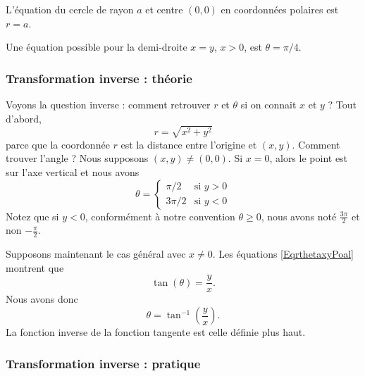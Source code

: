 \begin{example}
L'équation du cercle de rayon $a$ et centre $(0, 0)$ en coordonnées polaires est $r=a$.
\end{example}

\begin{example}
	Une équation possible pour la demi-droite $x=y$, $x>0$,  est $\theta=\pi/4$.
\end{example}
\subsubsection{Transformation inverse : théorie}

Voyons la question inverse : comment retrouver $r$ et $\theta$ si on connait $x$ et $y$ ? Tout d'abord,
\begin{equation}
	r=\sqrt{x^2+y^2}
\end{equation}
parce que la coordonnée $r$ est la distance entre l'origine et $(x,y)$. Comment trouver l'angle ? Nous supposons $(x,y)\neq (0,0)$. Si $x=0$, alors le point est sur l'axe vertical et nous avons
\begin{equation}
	\theta=\begin{cases}
		\pi/2	&	\text{si }y>0\\
		3\pi/2	&	 \text{si }y<0
	\end{cases}
\end{equation}
Notez que si $y<0$, conformément à notre convention $\theta\geq 0$, nous avons noté $\frac{ 3\pi }{2}$ et non $-\frac{ \pi }{ 2 }$.

Supposons maintenant le cas général avec $x\neq 0$. Les équations \eqref{EqrthetaxyPoal} montrent que
\begin{equation}
	\tan(\theta)=\frac{ y }{ x }.
\end{equation}
Nous avons donc
\begin{equation}
	\theta=\tan^{-1}\left( \frac{ y }{ x } \right).
\end{equation}
La fonction inverse de la fonction tangente est celle définie plus haut.

\subsubsection{Transformation inverse : pratique}

